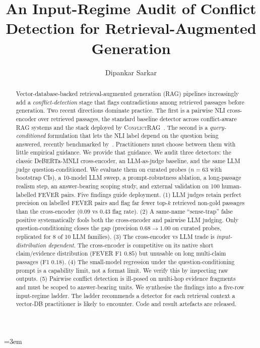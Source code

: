 \documentclass[sigconf, nonacm, natbib]{acmart}
\begin{document}
\emergencystretch=3em

\title{An Input-Regime Audit of Conflict Detection for Retrieval-Augmented Generation}

\author{Dipankar Sarkar}

\begin{abstract}
Vector-database-backed retrieval-augmented generation (RAG) pipelines increasingly add a
\emph{conflict-detection} stage that flags contradictions among retrieved passages before
generation. Two recent directions dominate practice. The first is a pairwise NLI
cross-encoder over retrieved passages, the standard baseline detector across
conflict-aware RAG systems and the stack deployed by
\textsc{ConflictRAG}~\citep{conflictrag2025}. The second is a
\emph{query-conditioned} formulation that lets the NLI label depend on the question
being answered, recently benchmarked by~\citet{canby2025qnli}. Practitioners must choose
between them with little empirical guidance. We provide that guidance. We audit three
detectors: the classic DeBERTa-MNLI cross-encoder, an LLM-as-judge baseline, and the
same LLM judge question-conditioned. We evaluate them on curated probes ($n{=}63$ with
bootstrap CIs), a 10-model LLM sweep, a prompt-robustness ablation, a long-passage
realism step, an answer-bearing scoping study, and external validation on 100
human-labelled FEVER pairs. Five findings guide deployment. (1) LLM judges retain
perfect precision on labelled FEVER pairs and flag far fewer top-$k$ retrieved non-gold
passages than the cross-encoder ($0.09$ vs $0.43$ flag rate).
(2) A same-name ``sense-trap'' false positive
systematically fools both the cross-encoder and pairwise LLM judging. Only
question-conditioning closes the gap (precision $0.68 \to 1.00$ on curated probes,
replicated for 8 of 10 LLM families). (3) The cross-encoder vs LLM trade is
\emph{input-distribution dependent}. The cross-encoder is competitive on its native
short claim/evidence distribution (FEVER F1 $0.85$) but unusable on long multi-claim
passages (F1 $0.18$). (4) The small-model regression under the question-conditioning
prompt is a capability limit, not a format limit. We verify this by inspecting raw
outputs. (5) Pairwise conflict detection is ill-posed on multi-hop evidence fragments
and must be scoped to answer-bearing units. We synthesise the findings into a five-row
input-regime ladder. The ladder recommends a detector for each retrieval context a
vector-DB practitioner is likely to encounter. Code and result artefacts are released.
\end{abstract}
\end{document}

